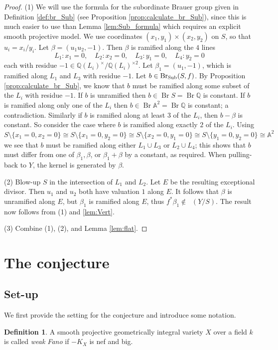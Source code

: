 \documentclass[a4paper,12pt,reqno]{amsart}
\numberwithin{equation}{section} \numberwithin{figure}{section}
\DeclareMathOperator{\Br}{Br} \DeclareMathOperator{\Brnr}{Br_{nr}}
\DeclareMathOperator{\BrV}{Br_{vert}}
\newcommand\Q{\mathbb{Q}}
\newcommand{\A}{\mathbb{A}}
\renewcommand{\#}{\sharp}
\theoremstyle{definition}
\newtheorem{definition}[lemma]{Definition}
\numberwithin{lemma}{section}
\begin{document}
\begin{proof}
(1) We will use the formula for the subordinate Brauer group given in Definition \ref{def:br_Sub} (see Proposition \ref{prop:calculate_br_Sub}), since this is much easier to use than Lemma \ref{lem:Sub_formula} which requires an explicit smooth projective model.
We use coordinates $(x_1,y_1) \times (x_2,y_2)$ on $S$, so that $u_i = x_i/y_i$.  Let $\beta = (u_1u_2,-1)$. Then $\beta$ is ramified along the $4$ lines 
$$L_1: x_1= 0, \quad L_2: x_2 = 0, \quad L_3: y_1 = 0, \quad L_4: y_2 = 0$$
each with residue $-1 \in \Q(L_i)^\times/\Q(L_i)^{\times 2}$. Let $\beta_1 = (u_1,-1)$, which is ramified along $L_1$ and $L_3$ with residue $-1$. Let $b \in \operatorname{Br_{\mathrm{Sub}}}(S,f)$. By Proposition \ref{prop:calculate_br_Sub}, we know that $b$ must be ramified along some subset of the $L_i$ with residue $-1$. If $b$ is unramified then $b \in \Br S = \Br \Q$ is constant. If $b$ is ramified along only one of the $L_i$ then $b \in \Br \A^2 = \Br \Q$ is constant; a contradiction. Similarly if $b$ is ramified along at least $3$ of the $L_i$, then $b - \beta$ is constant. So consider the case where $b$ is ramified along exactly $2$ of the $L_i$. Using $S \setminus \{x_1 = 0, x_2 = 0\} \cong S \setminus \{x_1 = 0, y_2 = 0\} \cong S \setminus \{x_2 = 0, y_1 = 0\} \cong S \setminus \{y_1 = 0, y_2 = 0\}\cong  \A^2$ we see that $b$ must be ramified along either $L_1 \cup L_3$ or $L_2 \cup L_4$; this shows that $b$ must differ from one of $\beta_1, \beta$, or $\beta_1 + \beta$ by a constant, as required. When pulling-back to $Y$, the kernel is generated by $\beta$.

(2) Blow-up $S$ in the  intersection of $L_1$ and $L_2$. Let $E$ be the resulting exceptional divisor. Then $u_1$ and $u_2$ both have valuation $1$ along $E$. It follows that $\beta$ is unramified along $E$, but $\beta_1$ is ramified along $E$, thus $f^*\beta_1 \notin \BrV(Y/S)$. The result now follows from (1) and \eqref{lem:Vert}.

(3) Combine (1), (2), and Lemma \ref{lem:flat}.
\end{proof}


\section{The conjecture} \label{sec:conj}

\subsection{Set-up} \label{sec:set-up}
We first provide the setting for the conjecture and introduce some notation.
\begin{definition}
	A smooth projective geometrically integral variety $X$ over a field $k$ is called \emph{weak Fano} if $-K_X$ is nef and big.
\end{definition}
\end{document}

